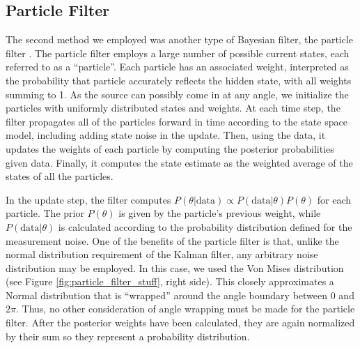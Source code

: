\documentclass[11pt]{amsart}
\begin{document}

\subsection{Particle Filter}
The second method we employed was another type of Bayesian filter, the particle filter \cite{Particle}. The particle filter employs a large number of possible current states, each referred to 
as a “particle”. Each particle has an associated weight, interpreted as the probability that particle accurately reflects the hidden state, with all weights summing to 1. As the source can possibly 
come in at any angle, we initialize the particles with uniformly distributed states and weights. At each time step, the filter propagates all of the particles forward in time according to the state space 
model, including adding state noise in the update. Then, using the data, it updates the weights of each particle by computing the posterior probabilities given data. Finally, it computes the state estimate 
as the weighted average of the states of all the particles. 

In the update step, the filter computes $P(\theta|\text{data}) \propto P(\text{data}|\theta)P(\theta)$ for each particle. The prior $P(\theta)$ is given by the particle’s previous weight, while $P(\text{data}|\theta)$ is calculated 
according to the probability distribution defined for the measurement noise. One of the benefits of the particle filter is that, unlike the normal distribution requirement of the Kalman filter, any arbitrary noise 
distribution may be employed. In this case, we used the Von Mises distribution (see Figure \ref{fig:particle_filter_stuff}, right side). This closely approximates a Normal distribution 
that is “wrapped” around the angle boundary between $0$ and $2\pi$. Thus, no other consideration of angle wrapping must be made for the particle filter. After the posterior weights have been calculated, they are again normalized by 
their sum so they represent a probability distribution.
\end{document}
